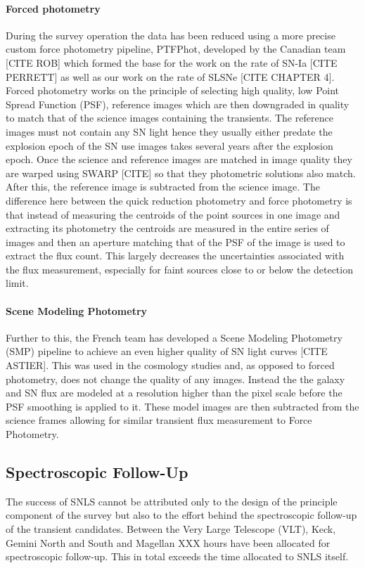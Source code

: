 \paragraph{Forced photometry}
During the survey operation the data has been reduced using a more precise custom force photometry pipeline, PTFPhot, developed by the Canadian team [CITE ROB] which formed the base for the work on the rate of SN-Ia [CITE PERRETT] as well as our work on the rate of SLSNe [CITE CHAPTER 4]. Forced photometry works on the principle of selecting high quality, low Point Spread Function (PSF), reference images which are then downgraded in quality to match that of the science images containing the transients. The reference images must not contain any SN light hence they usually either predate the explosion epoch of the SN use images takes several years after the explosion epoch. Once the science and reference images are matched in image quality they are warped using SWARP [CITE] so that they photometric solutions also match. After this, the reference image is subtracted from the science image. The difference here between the quick reduction photometry and force photometry is that instead of measuring the centroids of the point sources in one image and extracting its photometry the centroids are measured in the entire series of images and then an aperture matching that of the PSF of the image is used to extract the flux count. This largely decreases the uncertainties associated with the flux measurement, especially for faint sources close to or below the detection limit.

\paragraph{Scene Modeling Photometry}
Further to this, the French team has developed a Scene Modeling Photometry (SMP) pipeline to achieve an even higher quality of SN light curves [CITE ASTIER]. This was used in the cosmology studies and, as opposed to forced photometry, does not change the quality of any images. Instead the the galaxy and SN flux are modeled at a resolution higher than the pixel scale before the PSF smoothing is applied to it. These model images are then subtracted from the science frames allowing for similar transient flux measurement to Force Photometry.  
 
\subsection{Spectroscopic Follow-Up}
The success of SNLS cannot be attributed only to the design of the principle component of the survey but also to the effort behind the spectroscopic follow-up of the transient candidates. Between the Very Large Telescope (VLT), Keck, Gemini North and South and Magellan XXX hours have been allocated for spectroscopic follow-up. This in total exceeds the time allocated to SNLS itself. 



